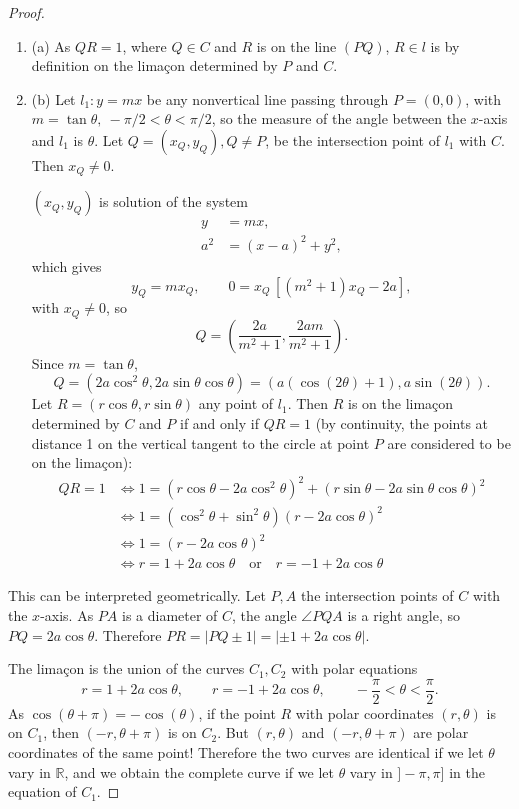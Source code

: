 \documentclass[11pt,a4paper]{article}
\newcommand{\be} {\begin{enumerate}}
\newcommand{\ee} {\end{enumerate}}
\newcommand{\R}{\mathbb{R}}
\begin{document}
\begin{proof}
\be
\item[(a)]  As $QR = 1$, where $Q \in C$ and $R$ is on the line $(PQ)$, $R\in l$ is by definition on the lima\c con determined by $P$ and $C$.

\item[(b)] Let $l_1 : y = mx$ be any nonvertical line passing through $P = (0,0)$, with $m = \tan \theta, \ -\pi / 2 <\theta < \pi/2$, so the measure of the angle between the $x$-axis and $l_1$ is $\theta$.  Let $Q =(x_Q,y_Q),Q \ne P$, be the intersection point of $l_1$ with $C$. Then $x_Q \ne 0$.

$(x_Q,y_Q)$ is solution of the system
\begin{align*}
y &= mx,\\
a^2 &=(x-a)^2 + y^2, 
\end{align*}
which gives $$y_Q = mx_Q,\qquad 0 = x_Q\, [(m^2+1)x_Q - 2a],$$ with $x_Q \ne 0$, so
$$Q = \left(\frac{2a}{m^2+1}, \frac{2am}{m^2+1}\right).$$
Since $m = \tan \theta$,
$$ Q = (2a \cos^2 \theta, 2a \sin \theta \cos \theta) = (a (\cos(2\theta)+1), a \sin(2\theta)).$$
Let $R = (r\cos \theta, r\sin \theta)$ any point of $l_1$.
Then $R$ is on the lima\c con determined by $C$ and $P$ if and only if $QR = 1$ (by continuity, the points at distance 1 on the vertical tangent to the circle at point $P$ are considered to be on the lima\c con):
\begin{align*}
QR = 1 &\iff 1 = (r \cos \theta - 2a \cos^2 \theta)^2 + (r \sin \theta  - 2 a \sin \theta \cos \theta)^2\\
&\iff 1 = (\cos^2 \theta + \sin^2 \theta)(r - 2 a \cos \theta)^2\\
&\iff 1 =(r - 2 a \cos \theta)^2\\
&\iff r = 1 + 2a \cos \theta \quad \mathrm{or} \quad r = -1 + 2a \cos \theta
\end{align*}
\ee
This can be interpreted geometrically. Let $P,A$ the intersection points of $C$ with the $x$-axis. As $PA$ is a diameter of $C$, the angle $\angle PQA$ is a right angle, so $PQ = 2a \cos \theta$. Therefore $PR = | PQ \pm 1| = |\pm 1 + 2a \cos \theta|$.

The lima\c con is the union of the curves $C_1,C_2$ with polar equations
$$ r = 1 + 2a \cos \theta, \qquad  r = -1 + 2a \cos \theta, \qquad -\frac{\pi}{2} < \theta < \frac{\pi}{2}.$$
As $\cos(\theta + \pi) = - \cos(\theta)$, if the point $R$ with polar coordinates $(r, \theta)$ is on $C_1$, then $(-r, \theta + \pi)$ is on $C_2$. But $(r,\theta)$ and  $(-r,\theta + \pi)$ are polar coordinates of the same point!  Therefore the two curves are identical if we let $\theta$ vary in $\R$, and we obtain the complete curve if we let $\theta$ vary in $]-\pi,\pi]$ in the equation of $C_1$.


\end{proof}
\end{document}
